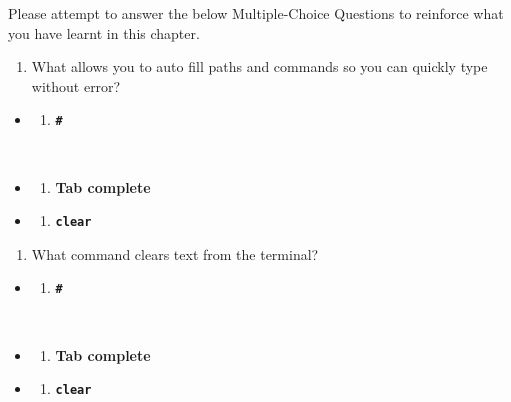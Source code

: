 \documentclass[
  letterpaper,
  DIV=11,
  numbers=noendperiod]{scrreprt}
\providecommand{\tightlist}{%
  \setlength{\itemsep}{0pt}\setlength{\parskip}{0pt}}
\begin{document}
Please attempt to answer the below Multiple-Choice Questions to
reinforce what you have learnt in this chapter.

\begin{enumerate}
\def\labelenumi{\arabic{enumi}.}
\tightlist
\item
  What allows you to auto fill paths and commands so you can quickly
  type without error?
\end{enumerate}

\begin{itemize}
\tightlist
\item
  \begin{enumerate}
  \def\labelenumi{(\Alph{enumi})}
  \tightlist
  \item
    \textbf{\texttt{\#}}\strut \\
  \end{enumerate}
\item
  \begin{enumerate}
  \def\labelenumi{(\Alph{enumi})}
  \setcounter{enumi}{1}
  \tightlist
  \item
    \textbf{Tab complete}\\
  \end{enumerate}
\item
  \begin{enumerate}
  \def\labelenumi{(\Alph{enumi})}
  \setcounter{enumi}{2}
  \tightlist
  \item
    \textbf{\texttt{clear}}
  \end{enumerate}
\end{itemize}

\begin{enumerate}
\def\labelenumi{\arabic{enumi}.}
\setcounter{enumi}{1}
\tightlist
\item
  What command clears text from the terminal?
\end{enumerate}

\begin{itemize}
\tightlist
\item
  \begin{enumerate}
  \def\labelenumi{(\Alph{enumi})}
  \tightlist
  \item
    \textbf{\texttt{\#}}\strut \\
  \end{enumerate}
\item
  \begin{enumerate}
  \def\labelenumi{(\Alph{enumi})}
  \setcounter{enumi}{1}
  \tightlist
  \item
    \textbf{Tab complete}\\
  \end{enumerate}
\item
  \begin{enumerate}
  \def\labelenumi{(\Alph{enumi})}
  \setcounter{enumi}{2}
  \tightlist
  \item
    \textbf{\texttt{clear}}
  \end{enumerate}
\end{itemize}
\end{document}
